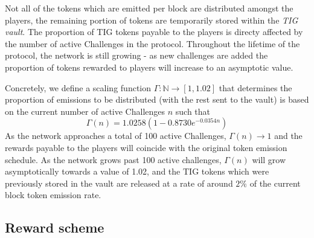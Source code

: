 \documentclass{contract}
\numberwithin{equation}{section}
\begin{document}
Not all of the tokens which are emitted per block are distributed amongst the players, the remaining portion of tokens are temporarily stored within the \emph{TIG vault}. 
The proportion of TIG tokens payable to the players is directy affected by the number of active Challenges in the protocol.
Throughout the lifetime of the protocol, the network is still growing - as new challenges are added the proportion of tokens rewarded to players will increase to an asymptotic value. 

Concretely, we define a scaling function $\Gamma:\mathbb{N} \rightarrow [1,1.02]$ that determines the proportion of emissions to be distributed (with the rest sent to the vault) is based on the current number of active Challenges $n$ such that 
\begin{equation}
    \Gamma(n) = 1.0258(1 - 0.8730e^{-0.0354n})
\end{equation}
As the network approaches a total of 100 active Challenges, $\Gamma(n) \rightarrow 1$ and the rewards payable to the players will coincide with the original token emission schedule.
As the network grows past 100 active challenges, $\Gamma(n)$ will grow asymptotically towards a value of 1.02, and the TIG tokens which were previously stored in the vault are released at a rate of around $2\%$ of the current block token emission rate. 

\subsection{Reward scheme}

\renewcommand*{\thefootnote}{\fnsymbol{footnote}}
\end{document}
